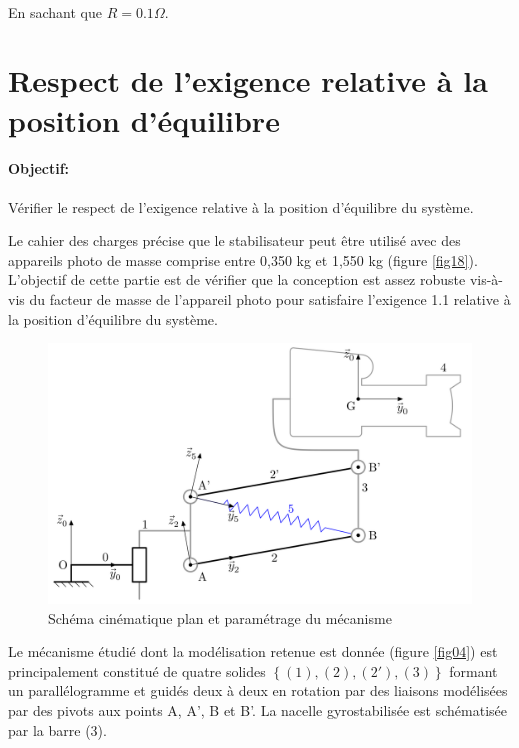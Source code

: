 


~\

En sachant que $R=0.1\Omega$.


\section{Respect de l'exigence relative à la position d'équilibre}

\paragraph{Objectif:} Vérifier le respect de l'exigence relative à la position d'équilibre du système.

Le cahier des charges précise que le stabilisateur peut être utilisé avec des appareils photo de masse comprise entre 0,350 kg et 1,550 kg (figure \ref{fig18}). L'objectif de cette partie est de vérifier que la conception est assez robuste vis-à-vis du facteur de masse de l'appareil photo pour satisfaire l'exigence 1.1 relative à la position d'équilibre
du système.

\begin{figure}[ht!]
\begin{center}
 \includegraphics[width=0.6\linewidth]{img/fig06}
\end{center}
\caption{Schéma cinématique plan et paramétrage du mécanisme}
\label{fig06}
\end{figure}

Le mécanisme étudié dont la modélisation retenue est donnée (figure \ref{fig04}) est principalement constitué de quatre solides $\left\{(1), (2), (2'), (3)\right\}$ formant un parallélogramme et guidés deux à deux en rotation par des liaisons modélisées par des pivots aux points A, A', B et B'. La nacelle gyrostabilisée est schématisée par la barre (3).

